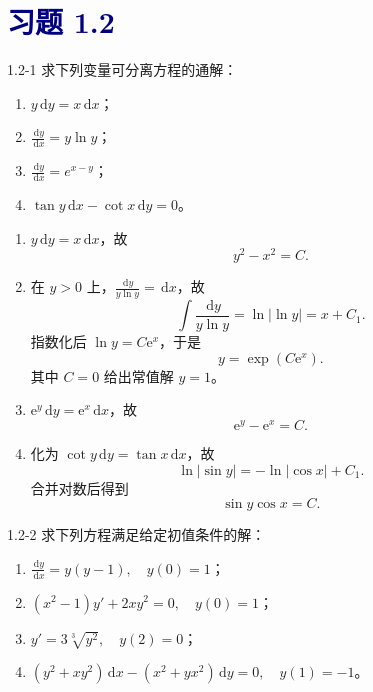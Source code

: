 \documentclass[UTF8,a4paper,11pt]{ctexart}
\newcommand{\dd}{\,\mathrm d}
\newcommand{\e}{\mathrm e}
\newcommand{\sect}[1]{\section*{\textcolor{navy}{习题 #1}}}
\begin{document}
\sect{1.2}
\begin{problem}{1.2-1}
求下列变量可分离方程的通解：
  \begin{enumerate}[label=(\arabic*)]
    \item $\displaystyle y\dd y=x\dd x$；
    \item $\displaystyle \frac{\dd y}{\dd x}=y\ln y$；
    \item $\displaystyle \frac{\dd y}{\dd x}=e^{x-y}$；
    \item $\displaystyle \tan y\dd x-\cot x\dd y=0$。
  \end{enumerate}
\end{problem}

\begin{solution}
\begin{enumerate}[label=(\arabic*)]
\item $y\dd y=x\dd x$，故
\[
\boxed{y^2-x^2=C}.
\]
\item 在 $y>0$ 上，$\frac{\dd y}{y\ln y}=\dd x$，故
\[
\int\frac{\dd y}{y\ln y}=\ln|\ln y|=x+C_1.
\]
指数化后 $\ln y=C\e^x$，于是
\[
\boxed{y=\exp(C\e^x)}.
\]
其中 $C=0$ 给出常值解 $y=1$。
\item $\e^y\dd y=\e^x\dd x$，故
\[
\boxed{\e^y-\e^x=C}.
\]
\item 化为 $\cot y\dd y=\tan x\dd x$，故
\[
\ln|\sin y|=-\ln|\cos x|+C_1.
\]
合并对数后得到
\[
\boxed{\sin y\cos x=C}.
\]
\end{enumerate}
\end{solution}

\begin{problem}{1.2-2}
求下列方程满足给定初值条件的解：
  \begin{enumerate}[label=(\arabic*)]
    \item $\displaystyle \frac{\dd y}{\dd x}=y(y-1),\quad y(0)=1$；
    \item $\displaystyle (x^2-1)y'+2xy^2=0,\quad y(0)=1$；
    \item $\displaystyle y'=3\sqrt[3]{y^2},\quad y(2)=0$；
    \item $\displaystyle (y^2+xy^2)\dd x-(x^2+yx^2)\dd y=0,\quad y(1)=-1$。
  \end{enumerate}
\end{problem}
\end{document}
